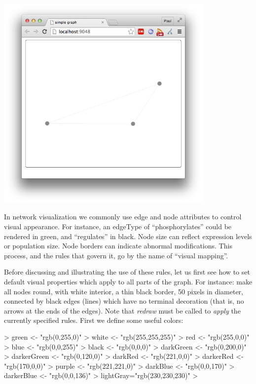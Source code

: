\documentclass{article}
\begin{document}
\includegraphics[width=0.8\textwidth]{fig0.png}

In network visualization we commonly use edge and node attributes to control visual appearance.
For instance, an edgeType of ``phosphorylates'' could be rendered in green, and ``regulates'' in black.
Node size can reflect expression levels or population size.  Node borders can indicate abnormal modifications.
This process, and the rules that govern it, go by the name of ``visual mapping''.  

Before discussing and illustrating the use of these rules, let us first see how to set default 
visual properties which apply to all parts of the graph.  For instance: make all nodes round, with
white interior, a thin black border, 50 pixels in diameter, connected by black edges (lines) which
have no terminal decoration (that is, no arrows at the ends of the edges).  Note that \emph{redraw}
must be called to \emph{apply} the currently specified rules.  First we define some useful colors:

\begin{Schunk}
\begin{Sinput}
> green <- "rgb(0,255,0)"
> white <- "rgb(255,255,255)"
> red <- "rgb(255,0,0)"
> blue <- "rgb(0,0,255)"
> black <- "rgb(0,0,0)"
> darkGreen <- "rgb(0,200,0)"
> darkerGreen <- "rgb(0,120,0)"
> darkRed <- "rgb(221,0,0)"
> darkerRed <- "rgb(170,0,0)"
> purple <- "rgb(221,221,0)"
> darkBlue <- "rgb(0,0,170)"
> darkerBlue <- "rgb(0,0,136)"
> lightGray="rgb(230,230,230)"
> 
\end{Sinput}
\end{Schunk}
\end{document}
